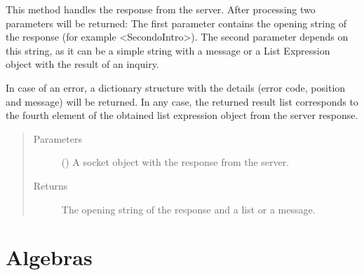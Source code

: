 \documentclass[letterpaper,10pt,english]{sphinxmanual}
\begin{document}

\begin{fulllineitems}
\label{\detokenize{index:secondodb.api.support.secondoparser.receive_response}}
This method handles the  response from the server. After processing two parameters will be returned: The first
parameter contains the opening string of the response (for example \textless{}SecondoIntro\textgreater{}). The second parameter depends on
this string, as it can be a simple string with a message or a List Expression object with the result of an inquiry.

In case of an error, a dictionary structure with the details (error code, position and message) will be returned. In
any case, the returned result list corresponds to the fourth element of the obtained list expression object from the
server response.
\begin{quote}\begin{description}
\item[{Parameters}] \leavevmode
{} () \textendash{} A socket object with the response from the server.

\item[{Returns}] \leavevmode
The opening string of the response and a list or a message.

\end{description}\end{quote}

\end{fulllineitems}



\section{ Algebras}
\label{\detokenize{index:sec-algebras}}
\end{document}
